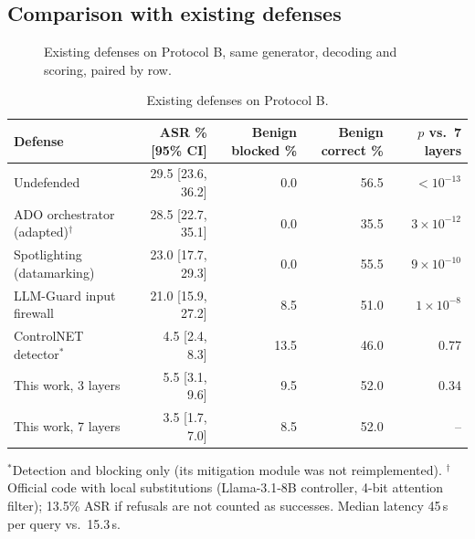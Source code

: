 \documentclass[11pt,a4paper]{article}
\begin{document}
\subsection{Comparison with existing defenses}\label{sec:existing}

\begin{figure}[h]
\centering
{}
\caption{Existing defenses on Protocol B, same generator, decoding and scoring, paired by row.}
\end{figure}

\begin{table}[h]
\centering\small
\begin{tabular}{@{}l r r r r@{}}
\toprule
Defense & ASR \% [95\% CI] & Benign blocked \% & Benign correct \% & $p$ vs.\ 7 layers \\
\midrule
Undefended & 29.5 [23.6, 36.2] & 0.0 & 56.5 & $<10^{-13}$ \\
ADO orchestrator (adapted)$^\dagger$ & 28.5 [22.7, 35.1] & 0.0 & 35.5 & $3\times10^{-12}$ \\
Spotlighting (datamarking) & 23.0 [17.7, 29.3] & 0.0 & 55.5 & $9\times10^{-10}$ \\
LLM-Guard input firewall & 21.0 [15.9, 27.2] & 8.5 & 51.0 & $1\times10^{-8}$ \\
ControlNET detector$^*$ & 4.5 [2.4, 8.3] & 13.5 & 46.0 & 0.77 \\
This work, 3 layers & 5.5 [3.1, 9.6] & 9.5 & 52.0 & 0.34 \\
This work, 7 layers & 3.5 [1.7, 7.0] & 8.5 & 52.0 & -- \\
\bottomrule
\end{tabular}

\footnotesize $^*$Detection and blocking only (its mitigation module was not reimplemented).
$^\dagger$Official code with local substitutions (Llama-3.1-8B controller, 4-bit attention filter); 13.5\% ASR if
refusals are not counted as successes. Median latency 45\,s per query vs.\ 15.3\,s.
\caption{Existing defenses on Protocol B.}
\end{table}
\end{document}
